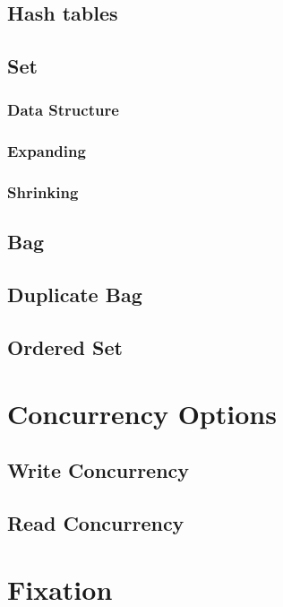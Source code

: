 \documentclass[aps,pre,preprint,nofootinbib]{revtex4}
\begin{document}
\subsection{Hash tables}

\subsection{Set}     %

\subsubsection{Data Structure}
\subsubsection{Expanding}
\subsubsection{Shrinking}

\subsection{Bag}
\subsection{Duplicate Bag}
\subsection{Ordered Set}


\section{Concurrency Options} \label{sec:concurrency_options}

\subsection{Write Concurrency}

\subsection{Read Concurrency}

\section{Fixation}
\end{document}
